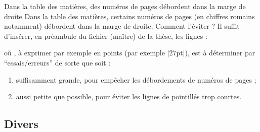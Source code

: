 \begin{dbfaq}{Dans la table des matières, des numéros de pages débordent dans
    la marge de droite}{}
  Dans la table des matières, certains numéros de pages (en chiffres romains
  notamment) débordent dans la marge de droite. Comment l'éviter ?
  \tcblower
  Il suffit d'insérer, en préambule du fichier (maître) de la thèse, les
  lignes :
\begin{preamblecode}[title=Par exemple dans le \File{\configurationfile}]
\makeatletter
\renewcommand*\@pnumwidth{"\meta{distance}"}
\makeatother
\end{preamblecode}
  où , à exprimer par exemple en points (par exemple |27pt|),
  est à déterminer par \enquote{essais/erreurs} de sorte que 
  soit :
  \begin{enumerate}
  \item suffisamment grande, pour empêcher les débordements de numéros de
    pages ;
  \item aussi petite que possible, pour éviter les lignes de pointillés trop
    courtes.
  \end{enumerate}
\end{dbfaq}

\subsection{Divers}
\label{sec-divers}

